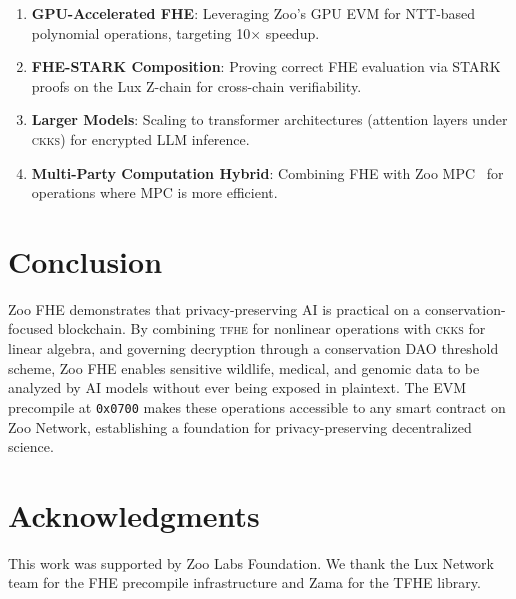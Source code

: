 \documentclass[11pt,letterpaper]{article}
\newcommand{\TFHE}{\textsc{tfhe}}
\newcommand{\CKKS}{\textsc{ckks}}
\begin{document}
\begin{enumerate}
    \item \textbf{GPU-Accelerated FHE}: Leveraging Zoo's GPU EVM for NTT-based polynomial operations, targeting 10$\times$ speedup.
    \item \textbf{FHE-STARK Composition}: Proving correct FHE evaluation via STARK proofs on the Lux Z-chain for cross-chain verifiability.
    \item \textbf{Larger Models}: Scaling to transformer architectures (attention layers under \CKKS{}) for encrypted LLM inference.
    \item \textbf{Multi-Party Computation Hybrid}: Combining FHE with Zoo MPC~\cite{lux-mchain-mpc} for operations where MPC is more efficient.
\end{enumerate}

\section{Conclusion}

Zoo FHE demonstrates that privacy-preserving AI is practical on a conservation-focused blockchain. By combining \TFHE{} for nonlinear operations with \CKKS{} for linear algebra, and governing decryption through a conservation DAO threshold scheme, Zoo FHE enables sensitive wildlife, medical, and genomic data to be analyzed by AI models without ever being exposed in plaintext. The EVM precompile at \texttt{0x0700} makes these operations accessible to any smart contract on Zoo Network, establishing a foundation for privacy-preserving decentralized science.

\section*{Acknowledgments}

This work was supported by Zoo Labs Foundation. We thank the Lux Network team for the FHE precompile infrastructure and Zama for the TFHE library.
\end{document}
